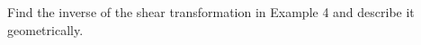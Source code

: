 \documentclass[../main.tex]{subfiles}
\begin{document}
Find the inverse of the shear transformation in Example 4 and describe it geometrically.

\solution
\end{document}
